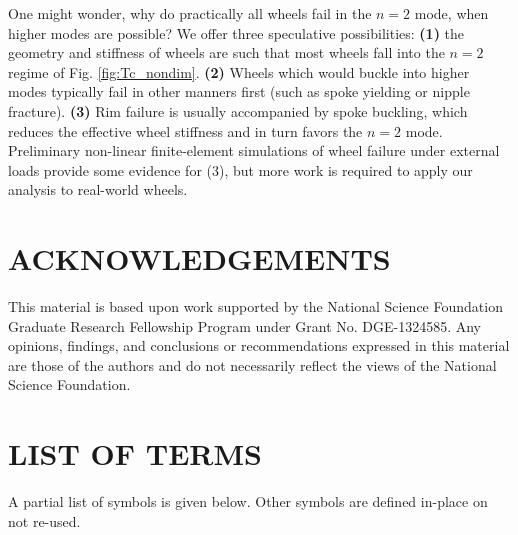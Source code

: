 \documentclass{bmd2016p}
\begin{document}
One might wonder, why do practically all wheels fail in the $n=2$ mode, when higher modes are possible? We offer three speculative possibilities: \textbf{(1)} the geometry and stiffness of wheels are such that most wheels fall into the $n=2$ regime of Fig. \ref{fig:Tc_nondim}. \textbf{(2)} Wheels which would buckle into higher modes typically fail in other manners first (such as spoke yielding or nipple fracture). \textbf{(3)} Rim failure is usually accompanied by spoke buckling, which reduces the effective wheel stiffness and in turn favors the $n=2$ mode. Preliminary non-linear finite-element simulations of wheel failure under external loads provide some evidence for (3), but more work is required to apply our analysis to real-world wheels.



\section*{ACKNOWLEDGEMENTS}
This material is based upon work supported by the National Science Foundation Graduate Research Fellowship Program under Grant No. DGE-1324585. Any opinions, findings, and conclusions or recommendations expressed in this material are those of the authors and do not necessarily reflect the views of the National Science Foundation.





\newpage
\section*{LIST OF TERMS}
A partial list of symbols is given below. Other symbols are defined in-place on not re-used.
\end{document}
